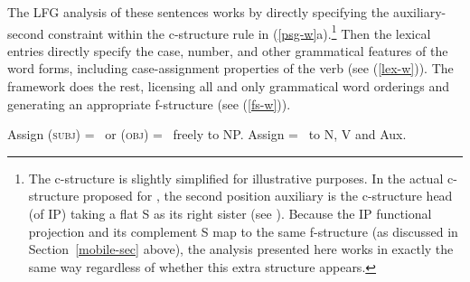 The LFG analysis of these sentences works by directly specifying the auxiliary-second constraint within the c-structure rule in (\ref{psg-w}a).\footnote{The c-structure is slightly simplified for illustrative purposes. In the actual c-structure proposed for , the second position auxiliary is the c-structure head (of IP) taking a flat S as its right sister (see \citealt[225]{austin+bresnan:1996}).  Because the IP functional projection and its complement S map to the same f-structure (as discussed in Section~\ref{mobile-sec} above),  the analysis presented here works in exactly the same way regardless of whether this extra structure appears.}  Then the lexical entries directly specify the case, number, and other grammatical features of the word forms, including case-assignment properties of the verb (see (\ref{lex-w})).  The framework does the rest, licensing all and only grammatical word orderings and generating an appropriate f-structure (see (\ref{fs-w})).

\eal  \label{psg-w}
\ex
{
}

\ex 
{
}
\zl


\eal  \label{ann-w}
\ex
\label{ann-w-a}
{ Assign (\up \textsc{subj}) = \down\ or (\up \textsc{obj}) = \down\ freely to NP.
\ex 
\label{ann-w-b}
{ Assign \up = \down\ to N, V and Aux.} }
\zl


\eal \label{lex-w} 
\ex 
{\qquad{}}

\ex 
{\qquad{}}

\ex 
{\qquad{}}

